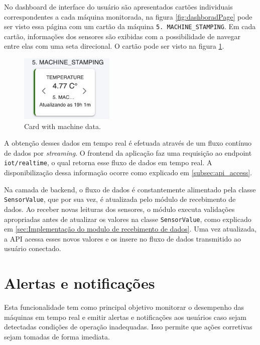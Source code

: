 No dashboard de interface do usuário são apresentados cartões individuais correspondentes a cada máquina monitorada, na figura \ref{fig:dashboradPage} pode ser visto essa página com um cartão da máquina \texttt{5. MACHINE\_STAMPING}. Em cada cartão, informações dos sensores são exibidas com a possibilidade de navegar entre elas com uma seta direcional. O cartão pode ser visto na figura \ref{fig:cardData}.

\begin{figure}[htbp]
	\centering
	\includegraphics[width=0.4\textwidth]{images/machineCard.png}
	\caption{Card with machine data.}
	\label{fig:cardData}
\end{figure}

A obtenção desses dados em tempo real é efetuada através de um fluxo contínuo de dados por \textit{streaming}. O frontend da aplicação faz uma requisição ao endpoint \texttt{iot/realtime}, o qual retorna esse fluxo de dados em tempo real. A disponibilização dessa informação ocorre como explicado em \ref{subsec:api_access}. 

Na camada de backend, o fluxo de dados é constantemente alimentado pela classe \texttt{SensorValue}, que por sua vez, é atualizada pelo módulo de recebimento de dados. Ao receber novas leituras dos sensores, o módulo executa validações apropriadas antes de atualizar os valores na classe \texttt{SensorValue}, como explicado em \ref{sec:Implementação do modulo de recebimento de dados}. Uma vez atualizada, a \gls{API} acessa esses novos valores e os insere no fluxo de dados transmitido ao usuário conectado.


\section[Alertas e notificações]{Alertas e notificações}\label{sec:alertsAndNotifications}

Esta funcionalidade tem como principal objetivo monitorar o desempenho das máquinas em tempo real e emitir alertas e notificações aos usuários caso sejam detectadas condições de operação inadequadas. Isso permite que ações corretivas sejam tomadas de forma imediata.

